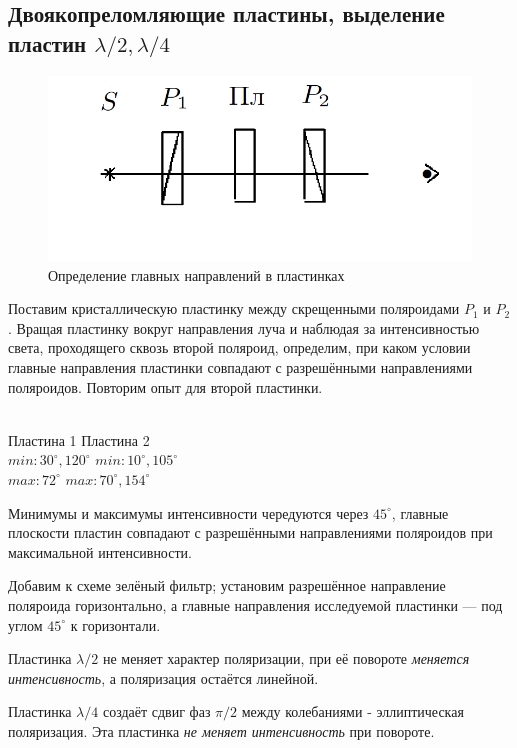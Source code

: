 \documentclass[a4paper,12pt]{article}
\begin{document}
\subsection{Двоякопреломляющие пластины, выделение пластин $ \lambda/2,  \lambda/4 $}
\begin{figure}
	\includegraphics[width=\linewidth]{7}
	\caption{Определение главных направлений в пластинках}
	\label{ris 7}
\end{figure}
Поставим кристаллическую пластинку
между скрещенными поляроидами $P_1$ и $P_2$. Вращая пластинку вокруг направления луча и наблюдая за интенсивностью света, проходящего сквозь второй поляроид, определим, при каком условии главные направления пластинки
совпадают с разрешёнными направлениями поляроидов. Повторим опыт для второй пластинки.\\
\\
\begin{center}
    Пластина 1 \hspace{1cm} Пластина 2 \\
    $min: 30^{\circ}, 120^{\circ}$ \hspace {1cm} $min: 10^{\circ}, 105^{\circ}$ \\
     $max: 72^{\circ}$ \hspace {1.9cm} $max: 70^{\circ}, 154^{\circ}$
\end{center}
\par Минимумы и максимумы интенсивности чередуются через $45^{\circ}$, главные плоскости пластин совпадают с разрешёнными направлениями поляроидов при максимальной интенсивности.

Добавим к схеме зелёный фильтр; установим разрешённое направление поляроида горизонтально, а главные направления исследуемой пластинки — под углом $45^{\circ}$ к горизонтали. \par 
Пластинка $\lambda/2$ не меняет характер поляризации, при её повороте \textit{меняется интенсивность}, а поляризация остаётся линейной. \par
Пластинка $\lambda/4$ создаёт сдвиг фаз $\pi/2$ между колебаниями - эллиптическая поляризация. Эта пластинка \textit{не меняет интенсивность} при повороте.
\end{document}
